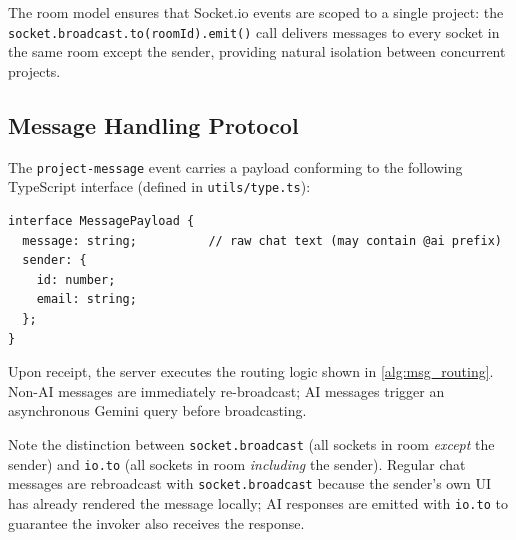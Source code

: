 The room model ensures that Socket.io events are scoped to a single project:
the \texttt{socket.broadcast.to(roomId).emit()} call delivers messages to
every socket in the same room except the sender, providing natural isolation
between concurrent projects.

\subsection{Message Handling Protocol}

The \texttt{project-message} event carries a payload conforming to the
following TypeScript interface (defined in \texttt{utils/type.ts}):

\begin{lstlisting}[caption={Message payload type.}, label=lst:msgtype]
interface MessagePayload {
  message: string;          // raw chat text (may contain @ai prefix)
  sender: {
    id: number;
    email: string;
  };
}
\end{lstlisting}

Upon receipt, the server executes the routing logic shown in
\cref{alg:msg_routing}. Non-AI messages are immediately re-broadcast; AI
messages trigger an asynchronous Gemini query before broadcasting.

\begin{algorithm}[H]
\caption{Message Routing (\texttt{socket.ts::HandleMessage})}
\label{alg:msg_routing}
\end{algorithm}

Note the distinction between \texttt{socket.broadcast} (all sockets in room
\emph{except} the sender) and \texttt{io.to} (all sockets in room
\emph{including} the sender). Regular chat messages are rebroadcast with
\texttt{socket.broadcast} because the sender's own UI has already rendered the
message locally; AI responses are emitted with \texttt{io.to} to guarantee the
invoker also receives the response.


